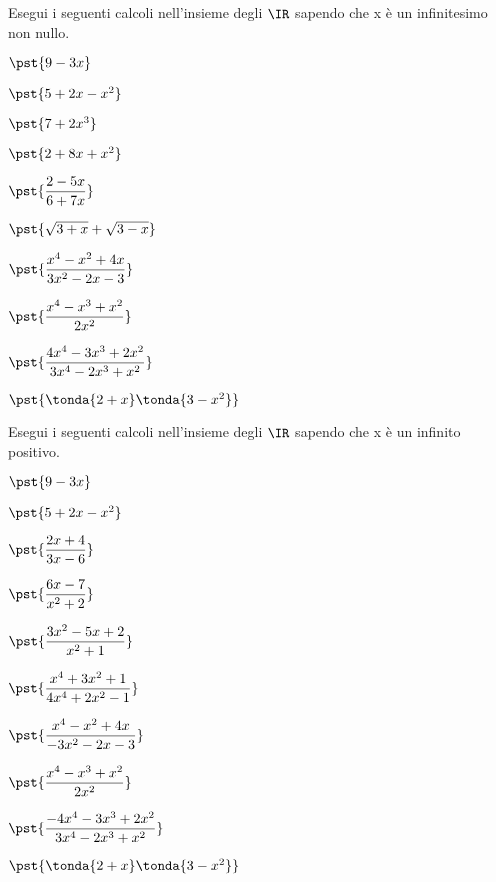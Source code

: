 \begin{esercizio}\label{ese:iper_op_01}
Esegui i seguenti calcoli nell'insieme degli \(\IR\) sapendo che 
x è un infinitesimo non nullo.
\begin{multicols}{2}
\begin{enumeratea}
 \item \(\pst{9 -3x}\)
 \item \(\pst{5 +2x -x^2}\)
 \item \(\pst{7 +2x^3}\) 
 \item \(\pst{2+8x+x^2}\) 
 \item \(\pst{\dfrac{2-5x}{6 +7x}}\)
 \item \(\pst{\sqrt{3 +x} + \sqrt{3 -x}}\) 
 \item \(\pst{\dfrac{x^4 - x^2 + 4x}{3x^2 -2x -3}}\) 
 \item \(\pst{\dfrac{x^4 - x^3 + x^2}{2x^2}}\) 
 \item \(\pst{\dfrac{4x^4 - 3x^3 + 2x^2}{3x^4 -2x^3 +x^2}} \) 
 \item \(\pst{\tonda{2+x}\tonda{3-x^2}} \)  
\end{enumeratea}
\end{multicols}
\end{esercizio}

\begin{esercizio}\label{ese:iper_op_01}
Esegui i seguenti calcoli nell'insieme degli \(\IR\) sapendo che 
x è un infinito positivo.
\begin{multicols}{2}
\begin{enumeratea}
 \item \(\pst{9 -3x}\)
 \item \(\pst{5 +2x -x^2}\)
 \item \(\pst{\dfrac{2x +4}{3x-6}}\)
 \item \(\pst{\dfrac{6 x-7}{x^2 +2}}\)
 \item \(\pst{\dfrac{3x^2 -5x +2}{x^2 +1}}\)
 \item \(\pst{\dfrac{x^4 +3x^2 +1}{4x^4 +2x^2 -1}}\)
 \item \(\pst{\dfrac{x^4 - x^2 + 4x}{-3x^2 -2x -3}}\) 
 \item \(\pst{\dfrac{x^4 - x^3 + x^2}{2x^2}}\) 
 \item \(\pst{\dfrac{-4x^4 - 3x^3 + 2x^2}{3x^4 -2x^3 +x^2}} \) 
 \item \(\pst{\tonda{2+x}\tonda{3-x^2}} \)  
\end{enumeratea}
\end{multicols}
\end{esercizio}


